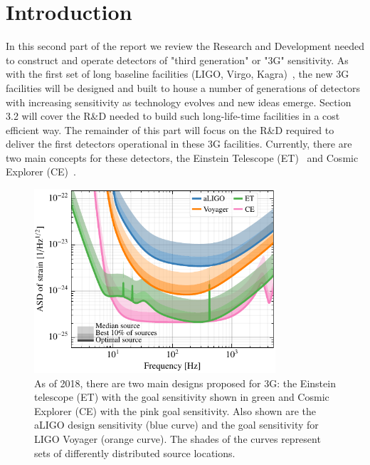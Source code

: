 \chapter{Introduction}
\label{sec:Intro}

In this second part of the report we review the Research and Development needed to construct and operate detectors of "third generation" or "3G" sensitivity. As with the first set of long baseline facilities (LIGO, Virgo, Kagra)~\cite{AdvancedVirgo2015,AdvancedLIGO2015,KAGRA2013}, the new 3G facilities will be designed and built to house a number of generations of detectors with increasing sensitivity as technology evolves and new ideas emerge. Section 3.2 will cover the R\&D needed to build such long-life-time facilities in a cost efficient way. The remainder of this part will focus on the R\&D required to deliver the first detectors operational in these 3G facilities. Currently, there are two main concepts for these detectors, the Einstein Telescope (ET)~\cite{ET2011} and Cosmic Explorer (CE)~\cite{CosmicExplorer2017}.

\begin{figure}[ht]
\centering
\includegraphics*[width= 0.8\textwidth]{Figures/noises_percentiles.pdf}
\caption{As of 2018, there are two main designs proposed for 3G:  the Einstein telescope (ET) \cite{ET2011} with the goal sensitivity shown in green and Cosmic Explorer (CE) \cite{CosmicExplorer2017} with the pink goal sensitivity.  Also shown are the aLIGO design sensitivity (blue curve) and the goal sensitivity for LIGO Voyager (orange curve). The shades of the curves represent sets of differently distributed source locations.}
\label{fig:3GSens}
\end{figure}

